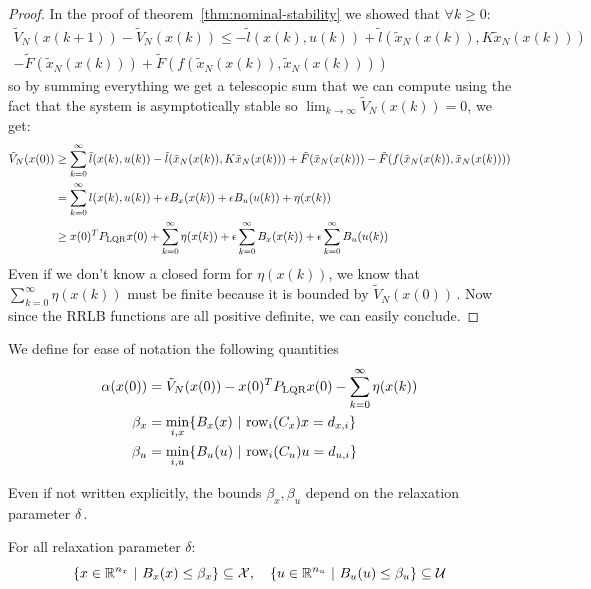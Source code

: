 \documentclass[12pt]{article}
\begin{document}
\begin{proof}
	In the proof of theorem~\ref{thm:nominal-stability} we showed that $\forall k\geq 0$:
	\begin{multline*}
		\tilde{V}_N(x(k+1))-\tilde{V}_N(x(k))\leq-\tilde{l}(x(k),u(k))+\tilde{l}(\tilde{x}_N(x(k)), K\tilde{x}_N(x(k)))\\
		-\tilde{F}(\tilde{x}_N(x(k)))+\tilde{F}(f(\tilde{x}_N(x(k)),\tilde{x}_N(x(k))))
	\end{multline*}
	so by summing everything we get a telescopic sum that we can compute using the fact that the system is asymptotically stable so $\lim_{k\to\infty}\tilde{V}_N(x(k))=0$, we get:
	\begin{align*}
		\tilde{V}_N(x(0))&\geq\sum_{k=0}^\infty\tilde{l}(x(k),u(k))-\tilde{l}(\tilde{x}_N(x(k)), K\tilde{x}_N(x(k)))+\tilde{F}(\tilde{x}_N(x(k)))-\tilde{F}(f(\tilde{x}_N(x(k)),\tilde{x}_N(x(k))))\\
		&=\sum_{k=0}^\infty l(x(k), u(k))+\epsilon B_x(x(k))+\epsilon B_u(u(k))+\eta(x(k))\\
		&\geq x(0)^TP_{\rm{LQR}}x(0)+\sum_{k=0}^\infty\eta(x(k))+\epsilon\sum_{k=0}^\infty B_x(x(k))+\epsilon\sum_{k=0}^\infty B_u(u(k))\\
	\end{align*}
	Even if we don't know a closed form for $\eta(x(k))$, we know that $\sum_{k=0}^\infty\eta(x(k))$ must be finite because it is bounded by $\tilde{V}_N(x(0))$\,.
	Now since the RRLB functions are all positive definite, we can easily conclude.
\end{proof}

We define for ease of notation the following quantities
\begin{align*}
	\alpha(x(0))&=\tilde{V}_N(x(0))-x(0)^TP_{\rm{LQR}}x(0)-\sum_{k=0}^\infty\eta(x(k))\\
	\beta_x&=\underset{i,x}{\min}\{B_x(x)~|~\rm{row}_i(C_x)x=d_{x,i}\}\\
	\beta_u&=\underset{i,u}{\min}\{B_u(u)~|~\rm{row}_i(C_u)u=d_{u,i}\}
\end{align*}

Even if not written explicitly, the bounds $\beta_x,\beta_u$ depend on the relaxation parameter $\delta$\,.

\begin{lemma}
	\label{thm:constraint-set-def-with-RRLB}
	For all relaxation parameter $\delta$:
	$$\left\{x\in\R^{n_x}~|~B_x(x)\leq\beta_x\right\}\subseteq\cal{X},\quad\left\{u\in\R^{n_u}~|~B_u(u)\leq\beta_u\right\}\subseteq\cal{U}$$
\end{lemma}
\end{document}
